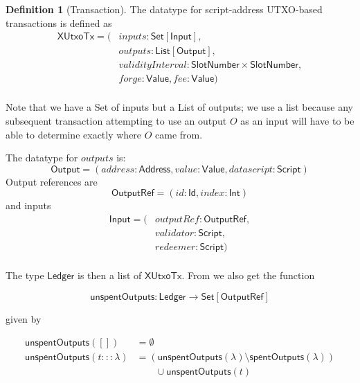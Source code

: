 \documentclass[a4paper]{article}
\theoremstyle{definition}  %
\newtheorem{definition}{Definition}
\begin{document}
\newcommand{\mi}[1]{\mathit{#1}}
\newcommand{\inputs}{\mathit{inputs}}
\newcommand{\outputs}{\mathit{outputs}}
\newcommand{\forge}{\mathit{forge}}
\newcommand{\fee}{\mathit{fee}}
\newcommand{\addr}{\mathit{address}}
\newcommand{\val}{\mathit{value}}

\newcommand{\slotnum}{\mathsf{SlotNumber}}
\newcommand{\spent}{\mathsf{spentOutputs}}
\newcommand{\unspent}{\mathsf{unspentOutputs}}
\newcommand{\xutox}{\mathsf{XUtxoTx}}

\noindent\begin{definition}[Transaction]
The datatype for script-address UTXO-based transactions is defined as 
  \begin{align*}
    \xutox = ( &\inputs: \mathsf{Set[Input]},\\
    &\outputs: \mathsf{List[Output]},\\
    &\mathit{validityInterval}: \slotnum \times \slotnum,\\
                        &\forge: \mathsf{Value}, \fee: \mathsf{Value})\\
  \end{align*}

\noindent Note that we have a \textsf{Set} of inputs but a
\textsf{List} of outputs; we use a list because any subsequent
transaction attempting to use an output $O$ as an input will have to
be able to determine exactly where $O$ came from.


\noindent  The datatype for $outputs$ is:
  \[
      \mathsf{Output} = (\addr: \mathsf{Address}, \val: \mathsf{Value}, \mi{datascript}: \mathsf{Script})
    \]
  Output references are
  \[
    \mathsf{OutputRef} = (\mi{id}: \mathsf{Id}, \mi{index}: \mathsf{Int})
  \]
  and inputs
  \begin{align*}
    \mathsf{Input} = (& \mi{outputRef}: \mathsf{OutputRef},\\
                      & \mi{validator}: \mathsf{Script},\\
                      & \mi{redeemer}: \mathsf{Script})\\
  \end{align*}
\end{definition}


\noindent The type $\mathsf{Ledger}$ is then a list of $\xutox$. From
\cite{Zahnentferner18-UTxO} we also get the function

\[
  \unspent : \mathsf{Ledger} \rightarrow \mathsf{Set[OutputRef]}
\]

\noindent given by

\begin{align*}
   \unspent([]) &=\emptyset \\
   \unspent(t:::\lambda) &= (\unspent(\lambda) \setminus \spent(\lambda)) \\
    & \qquad \cup \unspent(t)
\end{align*}
\end{document}
